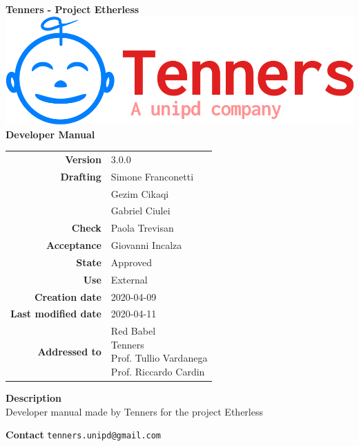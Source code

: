 \begin{titlepage}
	\begin{center}
		\large \textbf{Tenners - Project Etherless}
		\vfill
		\includegraphics[scale = 0.3]{./res/img/logo.png}\\
		\vfill
		\Huge \textbf{Developer Manual}

        \vfill
        \large

        \begin{tabular}{r|l}
                        \textbf{Version} & 3.0.0 \\
                        \textbf{Drafting} &
                        Simone Franconetti\\&
                        Gezim Cikaqi\\&
						Gabriel Ciulei\\
                        \textbf{Check} &
                        Paola Trevisan\\
                        \textbf{Acceptance} &
                        Giovanni Incalza\\
                        \textbf{State} & Approved \\
                        \textbf{Use} & External\\
                        \textbf{Creation date} &  2020-04-09\\
                        \textbf{Last modified date} &  2020-04-11\\
                        \textbf{Addressed to} & \parbox[t]{5cm}{Red Babel \\Tenners \\Prof. Tullio Vardanega \\Prof. Riccardo Cardin
                        							}
                \end{tabular}
                \vfill
                \normalsize
                \vfill
                                \textbf{Description}
                \\Developer manual made by Tenners for the project Etherless
                \vfill
                \normalsize
                \vfill
                
                \textbf{Contact}
                \texttt{tenners.unipd@gmail.com}

	\end{center}
\end{titlepage}
